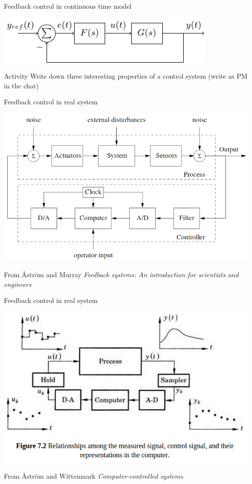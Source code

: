 \documentclass[presentation,aspectratio=169]{beamer}
\begin{document}
\begin{frame}[label={sec:org330e38c}]{Feedback control in continuous time model}
\begin{center}
\includegraphics[width=0.6\linewidth]{../../figures/block1}
\end{center}

\alert{Activity} Write down three interesting \alert{\alert{properties}} of a control system (write as PM in the chat)
\end{frame}
\begin{frame}[label={sec:org809c51a}]{Feedback control in real system}
\begin{center}
\includegraphics[width=0.7\linewidth]{../../figures/comp-contr-sys.png}
\end{center}
\footnotesize From Åström and Murray \emph{Feedback systems: An introduction for scientists and engineers}
\end{frame}

\begin{frame}[label={sec:orgef9bd9a}]{Feedback control in real system}
\begin{center}
\includegraphics[width=0.7\linewidth]{../../figures/fig7-2.png}
\end{center}
\footnotesize From Åström and Wittenmark \emph{Computer-controlled systems}
\end{frame}
\end{document}
